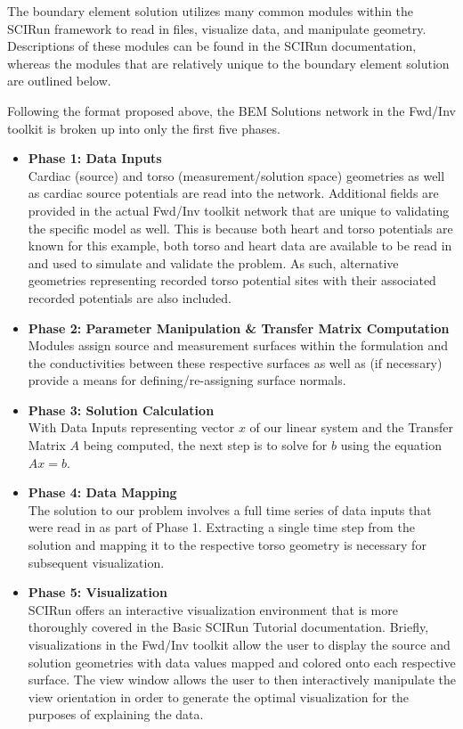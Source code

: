 The boundary element solution utilizes many common modules within the SCIRun framework
to read in files, visualize data, and manipulate geometry. Descriptions of these modules
can be found in the SCIRun documentation, whereas the modules that are relatively unique to the boundary element solution are outlined below.

Following the format proposed above, the BEM Solutions network in the Fwd/Inv toolkit is broken up into only the first five phases.
\begin{itemize}
\item {\bf Phase 1: Data Inputs} \\
Cardiac (source) and torso (measurement/solution space) geometries as well as cardiac source potentials are read into the network.  Additional fields are provided in the actual Fwd/Inv toolkit network that are unique to validating the specific model as well.  This is because both heart and torso potentials are known for this example, both torso and heart data are available to be read in and used to simulate and validate the problem.  As such, alternative geometries representing recorded torso potential sites with their associated recorded potentials are also included.
\item {\bf Phase 2: Parameter Manipulation \& Transfer Matrix Computation} \\
Modules assign source and measurement surfaces within the formulation and the conductivities between these respective surfaces as well as (if necessary) provide a means for defining/re-assigning surface normals.
\item {\bf Phase 3: Solution Calculation} \\
With Data Inputs representing vector $x$ of our linear system and the Transfer Matrix $A$ being computed, the next step is to solve for $b$ using the equation $Ax = b$.
\item {\bf Phase 4: Data Mapping} \\
The solution to our problem involves a full time series of data inputs that were read in as part of Phase 1. Extracting a single time step from the solution and mapping it to the respective torso geometry is necessary for subsequent visualization.
\item {\bf Phase 5: Visualization} \\
SCIRun offers an interactive visualization environment that is more thoroughly covered in the Basic SCIRun Tutorial documentation. Briefly, visualizations in the Fwd/Inv toolkit allow the user to display the source and solution geometries with data values mapped and colored onto each respective surface.  The view window allows the user to then interactively manipulate the view orientation in order to generate the optimal visualization for the purposes of explaining the data.
\end{itemize}

